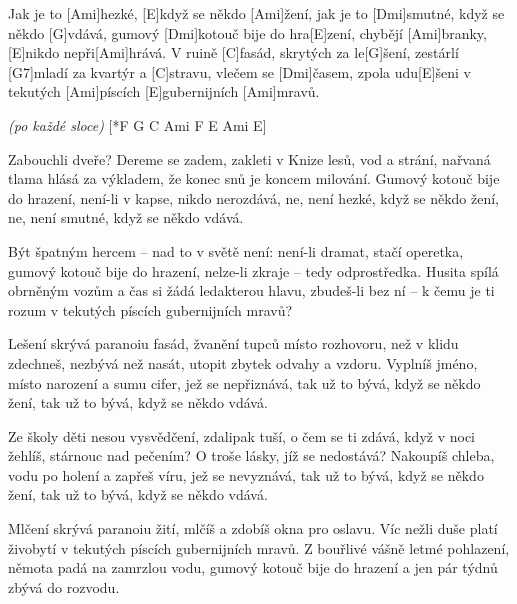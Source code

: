 
\sloka
Jak je to [Ami]hezké, [E]když se někdo [Ami]žení,
jak je to [Dmi]smutné, když se někdo [G]vdává,
gumový [Dmi]kotouč bije do hra[E]zení,
chybějí [Ami]branky, [E]nikdo nepři[Ami]hrává.
V ruině [C]fasád, skrytých za le[G]šení,
zestárlí [G7]mladí za kvartýr a [C]stravu,
vlečem se [Dmi]časem, zpola udu[E]šeni
v tekutých [Ami]píscích [E]gubernijních [Ami]mravů.

{\sl (po každé sloce)} [*F G C Ami F E Ami E]

\sloka
Zabouchli dveře? Dereme se zadem,
zakleti v Knize lesů, vod a strání,
nařvaná tlama hlásá za výkladem,
že konec snů je koncem milování.
Gumový kotouč bije do hrazení,
není-li v kapse, nikdo nerozdává,
ne, není hezké, když se někdo žení,
ne, není smutné, když se někdo vdává.

\sloka
Být špatným hercem – nad to v světě není:
není-li dramat, stačí operetka,
gumový kotouč bije do hrazení,
nelze-li zkraje – tedy odprostředka.
Husita spílá obrněným vozům
a čas si žádá ledakterou hlavu,
zbudeš-li bez ní – k čemu je ti rozum
v tekutých píscích gubernijních mravů?

\sloka
Lešení skrývá paranoiu fasád,
žvanění tupců místo rozhovoru,
než v klidu zdechneš, nezbývá než nasát,
utopit zbytek odvahy a vzdoru.
Vyplníš jméno, místo narození
a sumu cifer, jež se nepřiznává,
tak už to bývá, když se někdo žení,
tak už to bývá, když se někdo vdává.

\sloka
Ze školy děti nesou vysvědčení,
zdalipak tuší, o čem se ti zdává,
když v noci žehlíš, stárnouc nad pečením?
O troše lásky, jíž se nedostává?
Nakoupíš chleba, vodu po holení
a zapřeš víru, jež se nevyznává,
tak už to bývá, když se někdo žení,
tak už to bývá, když se někdo vdává.

\sloka
Mlčení skrývá paranoiu žití,
mlčíš a zdobíš okna pro oslavu.
Víc nežli duše platí živobytí
v tekutých píscích gubernijních mravů.
Z bouřlivé vášně letmé pohlazení,
němota padá na zamrzlou vodu,
gumový kotouč bije do hrazení
a jen pár týdnů zbývá do rozvodu.
